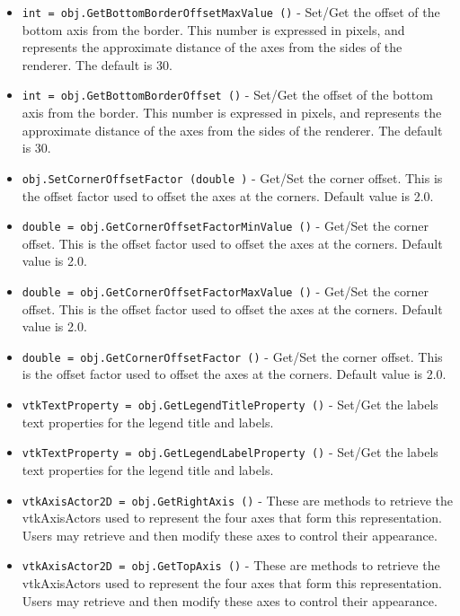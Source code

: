 \begin{itemize}
\item  \verb|int = obj.GetBottomBorderOffsetMaxValue ()| -  Set/Get the offset of the bottom axis from the border. This number is expressed in
 pixels, and represents the approximate distance of the axes from the sides
 of the renderer. The default is 30.

\item  \verb|int = obj.GetBottomBorderOffset ()| -  Set/Get the offset of the bottom axis from the border. This number is expressed in
 pixels, and represents the approximate distance of the axes from the sides
 of the renderer. The default is 30.

\item  \verb|obj.SetCornerOffsetFactor (double )| -  Get/Set the corner offset. This is the offset factor used to offset the
 axes at the corners. Default value is 2.0.

\item  \verb|double = obj.GetCornerOffsetFactorMinValue ()| -  Get/Set the corner offset. This is the offset factor used to offset the
 axes at the corners. Default value is 2.0.

\item  \verb|double = obj.GetCornerOffsetFactorMaxValue ()| -  Get/Set the corner offset. This is the offset factor used to offset the
 axes at the corners. Default value is 2.0.

\item  \verb|double = obj.GetCornerOffsetFactor ()| -  Get/Set the corner offset. This is the offset factor used to offset the
 axes at the corners. Default value is 2.0.

\item  \verb|vtkTextProperty = obj.GetLegendTitleProperty ()| -  Set/Get the labels text properties for the legend title and labels.

\item  \verb|vtkTextProperty = obj.GetLegendLabelProperty ()| -  Set/Get the labels text properties for the legend title and labels.

\item  \verb|vtkAxisActor2D = obj.GetRightAxis ()| -  These are methods to retrieve the vtkAxisActors used to represent
 the four axes that form this representation. Users may retrieve and
 then modify these axes to control their appearance.

\item  \verb|vtkAxisActor2D = obj.GetTopAxis ()| -  These are methods to retrieve the vtkAxisActors used to represent
 the four axes that form this representation. Users may retrieve and
 then modify these axes to control their appearance.


\end{itemize}
